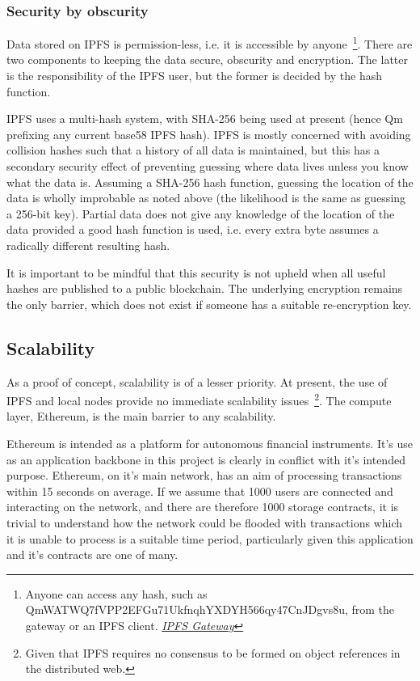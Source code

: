 \subsubsection{Security by obscurity}

Data stored on IPFS is permission-less, i.e. it is accessible by anyone~\footnote{Anyone can access any hash, such as QmWATWQ7fVPP2EFGu71UkfnqhYXDYH566qy47CnJDgvs8u, from the gateway or an IPFS client. \href{https://gateway.ipfs.io/ipfs/QmWATWQ7fVPP2EFGu71UkfnqhYXDYH566qy47CnJDgvs8u}{\textit{IPFS Gateway}}}. There are two components to keeping the data secure, obscurity and encryption. The latter is the responsibility of the IPFS user, but the former is decided by the hash function.

IPFS uses a multi-hash system, with SHA-256 being used at present (hence Qm prefixing any current base58 IPFS hash). IPFS is mostly concerned with avoiding collision hashes such that a history of all data is maintained, but this has a secondary security effect of preventing guessing where data lives unless you know what the data is. Assuming a SHA-256 hash function, guessing the location of the data is wholly improbable as noted above (the likelihood is the same as guessing a 256-bit key). Partial data does not give any knowledge of the location of the data provided a good hash function is used, i.e. every extra byte assumes a radically different resulting hash.

It is important to be mindful that this security is not upheld when all useful hashes are published to a public blockchain. The underlying encryption remains the only barrier, which does not exist if someone has a suitable re-encryption key.

\subsection{Scalability}

As a proof of concept, scalability is of a lesser priority. At present, the use of IPFS and local nodes provide no immediate scalability issues~\footnote{Given that IPFS requires no consensus to be formed on object references in the distributed web.}. The compute layer, Ethereum, is the main barrier to any scalability.

Ethereum is intended as a platform for autonomous financial instruments. It's use as an application backbone in this project is clearly in conflict with it's intended purpose. Ethereum, on it's main network, has an aim of processing transactions within 15 seconds on average. If we assume that 1000 users are connected and interacting on the network, and there are therefore 1000 storage contracts, it is trivial to understand how the network could be flooded with transactions which it is unable to process is a suitable time period, particularly given this application and it's contracts are one of many.

